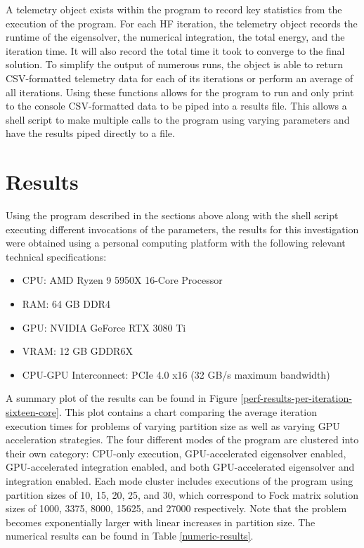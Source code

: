 \documentclass[conference, twoside]{IEEEtran}
\begin{document}
A telemetry object exists within the program to record key statistics from the execution of the program. For each HF iteration, the telemetry object records the runtime of the eigensolver, the numerical integration, the total energy, and the iteration time. It will also record the total time it took to converge to the final solution. To simplify the output of numerous runs, the object is able to return CSV-formatted telemetry data for each of its iterations or perform an average of all iterations. Using these functions allows for the program to run and only print to the console CSV-formatted data to be piped into a results file. This allows a shell script to make multiple calls to the program using varying parameters and have the results piped directly to a file.

\section{Results} %

Using the program described in the sections above along with the shell script executing different invocations of the parameters, the results for this investigation were obtained using a personal computing platform with the following relevant technical specifications:

\begin{itemize}
    \item CPU: AMD Ryzen 9 5950X 16-Core Processor
    \item RAM: 64 GB DDR4
    \item GPU: NVIDIA GeForce RTX 3080 Ti
    \item VRAM: 12 GB GDDR6X 
    \item CPU-GPU Interconnect: PCIe 4.0 x16 (32 GB/s maximum bandwidth)
\end{itemize}

A summary plot of the results can be found in Figure \ref{perf-results-per-iteration-sixteen-core}. This plot contains a chart comparing the average iteration execution times for problems of varying partition size as well as varying GPU acceleration strategies. The four different modes of the program are clustered into their own category: CPU-only execution, GPU-accelerated eigensolver enabled, GPU-accelerated integration enabled, and both GPU-accelerated eigensolver and integration enabled. Each mode cluster includes executions of the program using partition sizes of 10, 15, 20, 25, and 30, which correspond to Fock matrix solution sizes of 1000, 3375, 8000, 15625, and 27000 respectively. Note that the problem becomes exponentially larger with linear increases in partition size. The numerical results can be found in Table \ref{numeric-results}.
\end{document}
